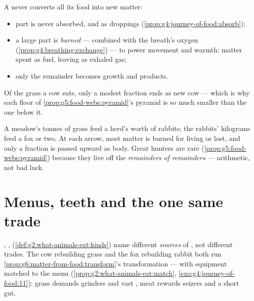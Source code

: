 \begin{proposition}\label{prop:g6:matter-from-food:losses}
A  never converts all its food into new matter:
\begin{itemize}
  \item part is never absorbed, and  as droppings
        (\cref{prop:g4:journey-of-food:absorb});
  \item a large part is \emph{burned} --- combined with the
        breath's oxygen
        (\cref{prop:g4:breathing:exchange}) --- to power
        movement and warmth: matter spent as fuel, leaving
        as exhaled gas;
  \item only the remainder becomes growth and products.
\end{itemize}
Of the grass a cow eats, only a modest fraction ends as new
cow --- which is why each floor of
\cref{prop:g5:food-webs:pyramid}'s pyramid is so much
smaller than the one below it.
\end{proposition}
\admitted

\begin{example}\label{ex:g6:matter-from-food:pyramid}
A meadow's tonnes of grass feed a herd's worth of rabbits;
the rabbits' kilograms feed a fox or two. At each arrow,
most matter is burned for living or lost, and only a
fraction is passed upward as body. Great hunters are rare
(\cref{prop:g5:food-webs:pyramid}) because they live off
the \emph{remainders of remainders} --- arithmetic, not
bad luck.
\end{example}

\section{Menus, teeth and the one same trade}

\begin{proposition}\label{prop:g6:matter-from-food:menus}
, , 
(\cref{def:g2:what-animals-eat:kinds}) name different
\emph{sources} of , not different trades. The
cow rebuilding grass and the fox rebuilding rabbit both run
\cref{prop:g6:matter-from-food:transform}'s transformation
--- with equipment matched to the menu
(\cref{prop:g2:what-animals-eat:match},
\cref{exo:g4:journey-of-food:11}): grass demands grinders
and vast , meat rewards seizers and a short gut.
\end{proposition}
\admitted

